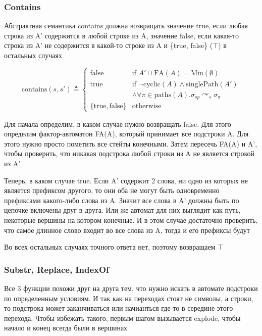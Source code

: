 \newpage
\subsubsection*{Contains}
Абстрактная семантика contains должна возвращать значение true, если любая строка из A' содержится в любой строке из A, значение false, если какая-то строка из A' не содержится в какой-то строке из A и \{true, false\} ($\top$) в остальных случаях

$$
\text{contains}(s, s') \triangleq 
\begin{cases}
\text{false} & \text{if } A' \sqcap \text{FA}(A) = \text{Min}(\emptyset) \\
\text{true} & \text{if } \neg \text{cyclic}(A) \land \text{singlePath}(A') \\
& \land \forall \pi \in \text{paths}(A). \sigma_{sp} \curvearrowright_s \sigma_{\pi} \\
\{ \text{true}, \text{false} \} & \text{otherwise}
\end{cases}
$$

Для начала определим, в каком случае нужно возвращать false. Для этого определим фактор-автоматон FA(A), который принимает все подстроки A. Для этого нужно просто пометить все стейты конечными. Затем пересечь FA(A) и A', чтобы проверить, что никакая подстрока любой строки из A не является строкой из A'

Теперь, в каком случае true. Если A' содержит 2 слова, ни одно из которых не является префиксом другого, то они оба не могут быть одновременно префиксами какого-либо слова из A. Значит все слова в A' должны быть по цепочке включены друг в друга. Или же автомат для них выглядит как путь, некоторые вершины на котором конечные. И в этом случае достаточно проверить, что самое длинное слово входит во все слова из A, тогда и его префиксы будут

Во всех остальных случаях точного ответа нет, поэтому возвращаем $\top$

\newpage
\subsubsection*{Substr, Replace, IndexOf}
Все 3 функции похожи друг на друга тем, что нужно искать в автомате подстроки по определенным условиям. И так как на переходах стоят не символы, а строки, то подстрока может заканчиваться или начианться где-то в середине этого перехода. Чтобы избежать такого, первым шагом вызывается explode, чтобы начало и конец всегда были в вершинах

